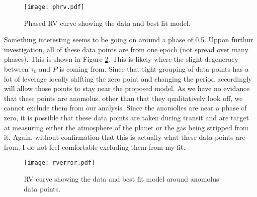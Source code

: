 \documentclass[11pt]{paper}
\begin{document}
\begin{figure}
\begin{center}
    \texttt{[image: phrv.pdf]}
    \caption{Phased RV curve showing the data and best fit model.}
    \label{fig:rv}
\end{center}
\end{figure}

Something interesting seems to be going on around a phase of 0.5. Uppon furthur investigation, all of these data points are from one epoch (not spread over many phases). This is shown in Figure \ref{fig:err}. This is likely where the slight degeneracy between $\tau_0$ and $P$ is coming from. Since that tight grouping of data points has a lot of leverage locally shifting the zero point and changing the period accordingly will allow those points to stay near the proposed model. As we have no evidance that these points are anomolus, other than that they qualitatively look off, we cannot exclude them from our analysis. Since the anomolies are near a phase of zero, it is possible that these data points are taken during transit and are target at measuring either the atmosphere of the planet or the gas being stripped from it. Again, without confirmation that this is actually what these data points are from, I do not feel comfortable excluding them from my fit.

\begin{figure}
\begin{center}
    \texttt{[image: rverror.pdf]}
    \caption{RV curve showing the data and best fit model around anomolus data points.}
    \label{fig:err}
\end{center}
\end{figure}
\end{document}
